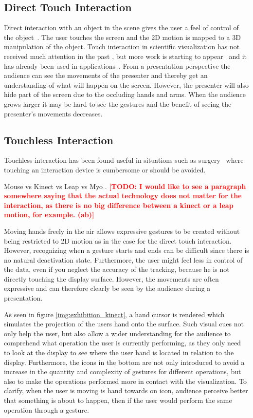 \documentclass[review,journal]{vgtc}         %
\newcommand{\todo}[1]{\textbf{\textcolor{red}{[TODO: {#1}]}}}
\begin{document}
\subsection{Direct Touch Interaction}
Direct interaction with an object in the scene gives the user a feel of control of the object~\cite{isenberg2009studying}. 
The user touches the screen and the 2D motion is mapped to a 3D manipulation of the object. 
Touch interaction in scientific visualization has not received much attention in the past \cite{isenberg:hal-00781512}, 
but more work is starting to appear~\cite{Klein:2012:DSD:2322389.2322403} and it has already been used in applications~\cite{LRFPY11}.
From a presentation perspective the audience can see the movements of the presenter and thereby get an understanding of what will happen on the screen.
However, the presenter will also hide part of the screen due to the occluding hands and arms. 
When the audience grows larger it may be hard to see the gestures and the benefit of seeing the presenter's movements decreases.


\subsection{Touchless Interaction}
Touchless interaction has been found useful in situations such as surgery~\cite{Mentis:2012:IPI:2207676.2208536} where touching an interaction device is cumbersome or should be avoided.

Mouse vs Kinect vs Leap vs Myo \cite{doi:10.1117/12.2006994}. \todo{I would like to see a paragraph somewhere saying that the actual technology does not matter for the interaction, as there is no big difference between a kinect or a leap motion, for example. (ab)}

Moving hands freely in the air allows expressive gestures to be created without being restricted to 2D motion as in the case for the direct touch interaction. However, recognizing when a gesture starts and ends can be difficult since there is no natural deactivation state. Furthermore, the user might feel less in control of the data, even if you neglect the accuracy of the tracking, because he is not directly touching the display surface. However, the movements are often expressive and can therefore clearly be seen by the audience during a presentation. 

As seen in figure \ref{img:exhibition_kinect}, a hand cursor is rendered which simulates the projection of the users hand onto the surface. Such visual cues not only help the user, but also allow a wider understanding for the audience to comprehend what operation the user is currently performing, as they only need to look at the display to see where the user hand is located in relation to the display. Furthermore, the icons in the bottom are not only introduced to avoid a increase in the quantity and complexity of gestures for different operations, but also to make the operations performed more in contact with the visualization. To clarify, when the user is moving is hand towards on icon, audience perceive better that something is about to happen, then if the user would perform the same operation through a gesture.
\end{document}
